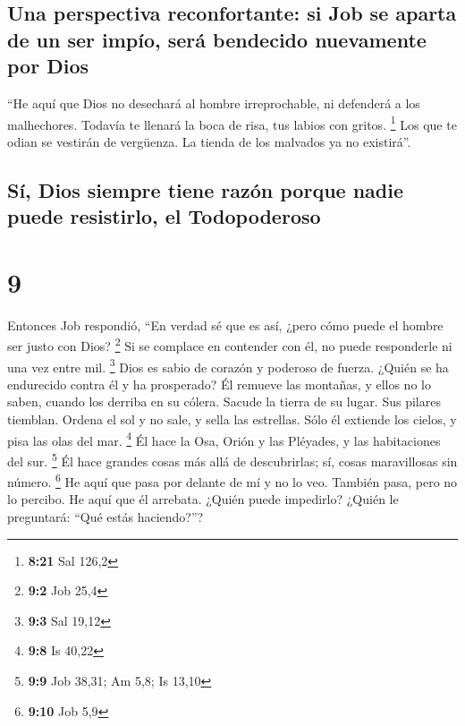 \hypertarget{una-perspectiva-reconfortante-si-job-se-aparta-de-un-ser-impuxedo-seruxe1-bendecido-nuevamente-por-dios}{%
\subsection{Una perspectiva reconfortante: si Job se aparta de un ser
impío, será bendecido nuevamente por
Dios}\label{una-perspectiva-reconfortante-si-job-se-aparta-de-un-ser-impuxedo-seruxe1-bendecido-nuevamente-por-dios}}

 ``He aquí que Dios no desechará al hombre irreprochable,
ni defenderá a los malhechores.  Todavía te llenará la
boca de risa, tus labios con gritos. \footnote{\textbf{8:21} Sal 126,2}
 Los que te odian se vestirán de vergüenza. La tienda de
los malvados ya no existirá''.

\hypertarget{suxed-dios-siempre-tiene-razuxf3n-porque-nadie-puede-resistirlo-el-todopoderoso}{%
\subsection{Sí, Dios siempre tiene razón porque nadie puede resistirlo,
el
Todopoderoso}\label{suxed-dios-siempre-tiene-razuxf3n-porque-nadie-puede-resistirlo-el-todopoderoso}}

\hypertarget{section-8}{%
\section{9}\label{section-8}}

 Entonces Job respondió,  ``En verdad sé que
es así, ¿pero cómo puede el hombre ser justo con Dios? \footnote{\textbf{9:2}
  Job 25,4}  Si se complace en contender con él, no puede
responderle ni una vez entre mil. \footnote{\textbf{9:3} Sal 19,12}
 Dios es sabio de corazón y poderoso de fuerza. ¿Quién se
ha endurecido contra él y ha prosperado?  Él remueve las
montañas, y ellos no lo saben, cuando los derriba en su cólera.
 Sacude la tierra de su lugar. Sus pilares tiemblan.
 Ordena el sol y no sale, y sella las estrellas.
 Sólo él extiende los cielos, y pisa las olas del mar.
\footnote{\textbf{9:8} Is 40,22}  Él hace la Osa, Orión y
las Pléyades, y las habitaciones del sur. \footnote{\textbf{9:9} Job
  38,31; Am 5,8; Is 13,10}  Él hace grandes cosas más
allá de descubrirlas; sí, cosas maravillosas sin número. \footnote{\textbf{9:10}
  Job 5,9}  He aquí que pasa por delante de mí y no lo
veo. También pasa, pero no lo percibo.  He aquí que él
arrebata. ¿Quién puede impedirlo? ¿Quién le preguntará: ``Qué estás
haciendo?''?

